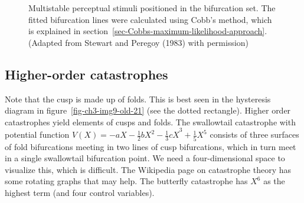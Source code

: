 \documentclass[
  a4paper,
  DIV=11,
  numbers=noendperiod,
  oneside]{scrreprt}
\begin{document}
\begin{figure}


\caption{\label{fig-ch3-img14-old-26}Multistable perceptual stimuli
positioned in the bifurcation set. The fitted bifurcation lines were
calculated using Cobb's method, which is explained in
section~\ref{sec-Cobbs-maximum-likelihood-approach}. (Adapted from
Stewart and Peregoy (1983) with permission)}

\end{figure}%

\subsection{Higher-order
catastrophes}\label{sec-Higher-order-catastrophes}

Note that the cusp is made up of folds. This is best seen in the
hysteresis diagram in figure~\ref{fig-ch3-img9-old-21} (see the dotted
rectangle). Higher order catastrophes yield elements of cusps and folds.
The swallowtail catastrophe with potential function
\(V(X) = {- aX - \frac{1}{2}bX^{2} - \frac{1}{3}cX}^{3} + \frac{1}{5}X^{5}\)
consists of three surfaces of fold bifurcations meeting in two lines of
cusp bifurcations, which in turn meet in a single swallowtail
bifurcation point. We need a four-dimensional space to visualize this,
which is difficult. The Wikipedia page on catastrophe theory has some
rotating graphs that may help. The butterfly catastrophe has \(X^{6}\)
as the highest term (and four control variables).
\end{document}
